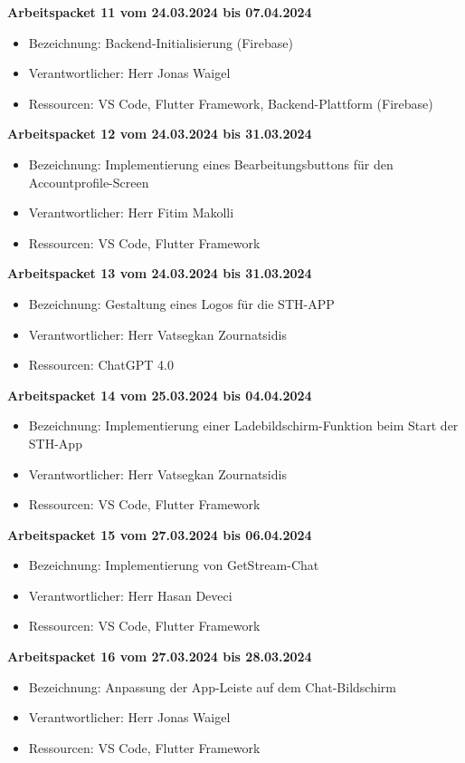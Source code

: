 \textbf{Arbeitspacket 11 vom 24.03.2024 bis 07.04.2024}
\begin{itemize}[itemsep=0pt]
	\item{Bezeichnung: Backend-Initialisierung (Firebase)}
	\item{Verantwortlicher: Herr Jonas Waigel} 
	\item{Ressourcen: VS Code, Flutter Framework, Backend-Plattform (Firebase)} 
\end{itemize}

\newpage
\textbf{Arbeitspacket 12 vom 24.03.2024 bis 31.03.2024}
\begin{itemize}[itemsep=0pt]
	\item{Bezeichnung: Implementierung eines Bearbeitungsbuttons für den Accountprofile-Screen}
	\item{Verantwortlicher: Herr Fitim Makolli} 
	\item{Ressourcen: VS Code, Flutter Framework} 
\end{itemize}

\textbf{Arbeitspacket 13 vom 24.03.2024 bis 31.03.2024}
\begin{itemize}[itemsep=0pt]
	\item{Bezeichnung: Gestaltung eines Logos für die STH-APP}
	\item{Verantwortlicher: Herr Vatsegkan Zournatsidis} 
	\item{Ressourcen: ChatGPT 4.0} 
\end{itemize} 

\textbf{Arbeitspacket 14 vom 25.03.2024 bis 04.04.2024}
\begin{itemize}[itemsep=0pt]
	\item{Bezeichnung: Implementierung einer Ladebildschirm-Funktion beim Start der STH-App}
	\item{Verantwortlicher: Herr Vatsegkan Zournatsidis} 
	\item{Ressourcen: VS Code, Flutter Framework} 
\end{itemize}

\textbf{Arbeitspacket 15 vom 27.03.2024 bis 06.04.2024}
\begin{itemize}[itemsep=0pt]
	\item{Bezeichnung: Implementierung von GetStream-Chat}
	\item{Verantwortlicher: Herr Hasan Deveci} 
	\item{Ressourcen: VS Code, Flutter Framework} 
\end{itemize}

\textbf{Arbeitspacket 16 vom 27.03.2024 bis 28.03.2024}
\begin{itemize}[itemsep=0pt]
	\item{Bezeichnung: Anpassung der App-Leiste auf dem Chat-Bildschirm}
	\item{Verantwortlicher: Herr Jonas Waigel} 
	\item{Ressourcen: VS Code, Flutter Framework} 
\end{itemize} 

